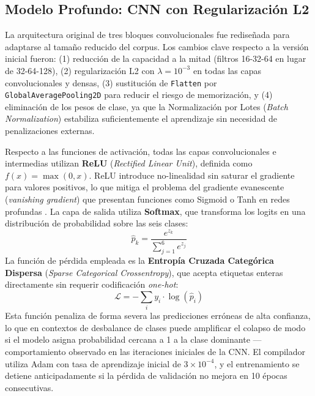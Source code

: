 \documentclass[conference]{IEEEtran}
\begin{document}
\subsection{Modelo Profundo: CNN con Regularización L2}
La arquitectura original de tres bloques convolucionales fue rediseñada para adaptarse al tamaño reducido del corpus. Los cambios clave respecto a la versión inicial fueron: (1) reducción de la capacidad a la mitad (filtros 16-32-64 en lugar de 32-64-128), (2) regularización L2 con $\lambda = 10^{-3}$ en todas las capas convolucionales y densas, (3) sustitución de \texttt{Flatten} por \texttt{GlobalAveragePooling2D} para reducir el riesgo de memorización, y (4) eliminación de los pesos de clase, ya que la Normalización por Lotes (\textit{Batch Normalization}) \cite{b4} estabiliza suficientemente el aprendizaje sin necesidad de penalizaciones externas.

Respecto a las funciones de activación, todas las capas convolucionales e intermedias utilizan \textbf{ReLU} (\textit{Rectified Linear Unit}), definida como $f(x) = \max(0, x)$. ReLU introduce no-linealidad sin saturar el gradiente para valores positivos, lo que mitiga el problema del gradiente evanescente (\textit{vanishing gradient}) que presentan funciones como Sigmoid o Tanh en redes profundas \cite{b6}. La capa de salida utiliza \textbf{Softmax}, que transforma los logits en una distribución de probabilidad sobre las seis clases:
\begin{equation}
\hat{p}_k = \frac{e^{z_k}}{\sum_{j=1}^{6} e^{z_j}}
\label{eq:softmax}
\end{equation}
La función de pérdida empleada es la \textbf{Entropía Cruzada Categórica Dispersa} (\textit{Sparse Categorical Crossentropy}), que acepta etiquetas enteras directamente sin requerir codificación \textit{one-hot}:
\begin{equation}
\mathcal{L} = -\sum_{i} y_i \cdot \log(\hat{p}_i)
\label{eq:loss}
\end{equation}
Esta función penaliza de forma severa las predicciones erróneas de alta confianza, lo que en contextos de desbalance de clases puede amplificar el colapso de modo si el modelo asigna probabilidad cercana a 1 a la clase dominante — comportamiento observado en las iteraciones iniciales de la CNN. El compilador utiliza Adam con tasa de aprendizaje inicial de $3 \times 10^{-4}$, y el entrenamiento se detiene anticipadamente si la pérdida de validación no mejora en 10 épocas consecutivas.
\end{document}
